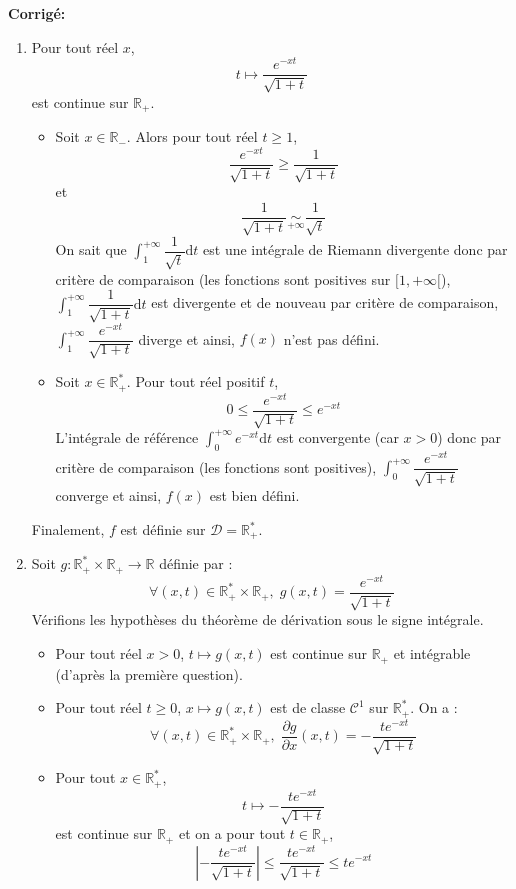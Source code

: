\documentclass[a4paper,twoside,french,11pt]{VcCours}
\newcommand{\dt}{\text{d}t}
\newcommand{\corr}{\textbf{Corrigé:}}
\begin{document}
\corr 

\begin{enumerate}
\item Pour tout réel $x$,
$$ t \mapsto \dfrac{e^{-xt}}{\sqrt{1+t}}$$
est continue sur $\mathbb{R}_+$.

\begin{itemize}
\item Soit $x \in \mathbb{R}_{-}$. Alors pour tout réel $t \geq 1$,
$$ \dfrac{e^{-xt}}{\sqrt{1+t}} \geq \dfrac{1}{\sqrt{1+t}}$$
et 
$$ \dfrac{1}{\sqrt{1+t}} \underset{+ \infty}{\sim} \dfrac{1}{\sqrt{t}}$$
On sait que $\int_1^{+ \infty} \dfrac{1}{\sqrt{t}} \dt$ est une intégrale de Riemann divergente donc par critère de comparaison (les fonctions sont positives sur $[1, + \infty[$), $\int_1^{+ \infty}  \dfrac{1}{\sqrt{1+t}}  \dt$ est divergente et de nouveau par critère de comparaison, $\int_1^{+ \infty} \dfrac{e^{-xt}}{\sqrt{1+t}}$ diverge et ainsi, $f(x)$ n'est pas défini.
\item Soit $x \in \mathbb{R}_+^*$. Pour tout réel positif $t$,
$$ 0 \leq  \dfrac{e^{-xt}}{\sqrt{1+t}} \leq e^{-xt}$$
L'intégrale de référence $\int_0^{+ \infty} e^{-xt} \dt$ est convergente (car $x>0$) donc par critère de comparaison (les fonctions sont positives), $ \int_0^{+ \infty} \dfrac{e^{-xt}}{\sqrt{1+t}}$ converge et ainsi, $f(x)$ est bien défini.
\end{itemize}
Finalement, $f$ est définie sur $\mathcal{D}= \mathbb{R}_+^*$.
\item Soit $g : \mathbb{R}_+^* \times \mathbb{R}_+ \rightarrow \mathbb{R}$ définie par :
$$ \forall (x,t) \in \mathbb{R}_+^* \times \mathbb{R}_+, \; g(x,t) = \dfrac{e^{-xt}}{\sqrt{1+t}} $$
Vérifions les hypothèses du théorème de dérivation sous le signe intégrale.
\begin{itemize}
\item Pour tout réel $x>0$, $t \mapsto g(x,t)$ est continue sur $\mathbb{R}_+$ et intégrable (d'après la première question).
\item Pour tout réel $t \geq 0$, $x \mapsto g(x,t)$ est de classe $\mathcal{C}^1$ sur $\mathbb{R}_+^*$. On a :
$$ \forall (x,t) \in \mathbb{R}_+^* \times \mathbb{R}_+, \; \dfrac{\partial g}{\partial x}(x,t) =  -  \dfrac{te^{-xt}}{\sqrt{1+t}}$$
\item Pour tout $x \in \mathbb{R}_+^*$,
$$ t \mapsto   -  \dfrac{te^{-xt}}{\sqrt{1+t}}$$
est continue sur $\mathbb{R}_+$ et on a pour tout $t \in \mathbb{R}_+$,
$$ \left\vert  -  \dfrac{te^{-xt}}{\sqrt{1+t}} \right\vert \leq  \dfrac{te^{-xt}}{\sqrt{1+t}} \leq t e^{-xt}$$

\end{itemize}
\end{enumerate}
\end{document}
